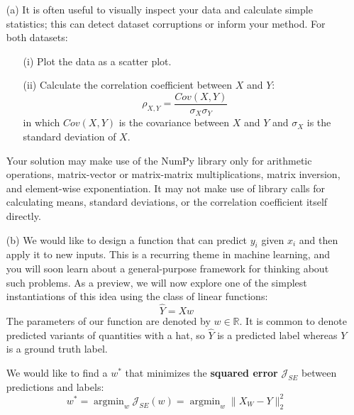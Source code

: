 \documentclass{article}
\begin{document}
        \begin{itemize}
            \item [(a)] It is often useful to visually inspect your data and calculate simple statistics; this can detect dataset corruptions or inform your method. For both datasets:
                \begin{itemize}
                    \item [(i)] Plot the data as a scatter plot.

                    \item [(ii)] Calculate the correlation coefficient between $X$ and $Y$:
                        \begin{equation*}
                            \rho_{X, Y} = \dfrac{Cov(X, Y)}{\sigma_{X}\sigma_{Y}}
                        \end{equation*}
                    in which $Cov(X, Y)$ is the covariance between $X$ and $Y$ and $\sigma_{X}$ is the standard deviation of $X$.
                \end{itemize}
            Your solution may make use of the NumPy library only for arithmetic operations, matrix-vector or matrix-matrix multiplications, matrix inversion, and element-wise exponentiation. It may not make use of library calls for calculating means, standard deviations, or the correlation coefficient itself directly.

            \item [(b)] We would like to design a function that can predict $y_{i}$ given $x_{i}$ and then apply it to new inputs. This is a recurring theme in machine learning, and you will soon learn about a general-purpose framework for thinking about such problems. As a preview, we will now explore one of the simplest instantiations of this idea using the class of linear functions:
                \begin{equation*}
                    \hat{Y} = Xw
                \end{equation*}
            The parameters of our function are denoted by $w \in \mathbb{R}$. It is common to denote predicted variants of quantities with a hat, so $\hat{Y}$ is a predicted label whereas $Y$ is a ground truth label.

            We would like to find a $w^{*}$ that minimizes the \textbf{squared error} $\mathcal{J}_{SE}$ between predictions and labels:
                \begin{equation*}
                    w^{*} = \mathop{argmin}_{w}\mathcal{J}_{SE}(w) = \mathop{argmin}_{w}\lVert X_{W} - Y \rVert_{2}^{2}
                \end{equation*}


\end{itemize}
\end{document}
